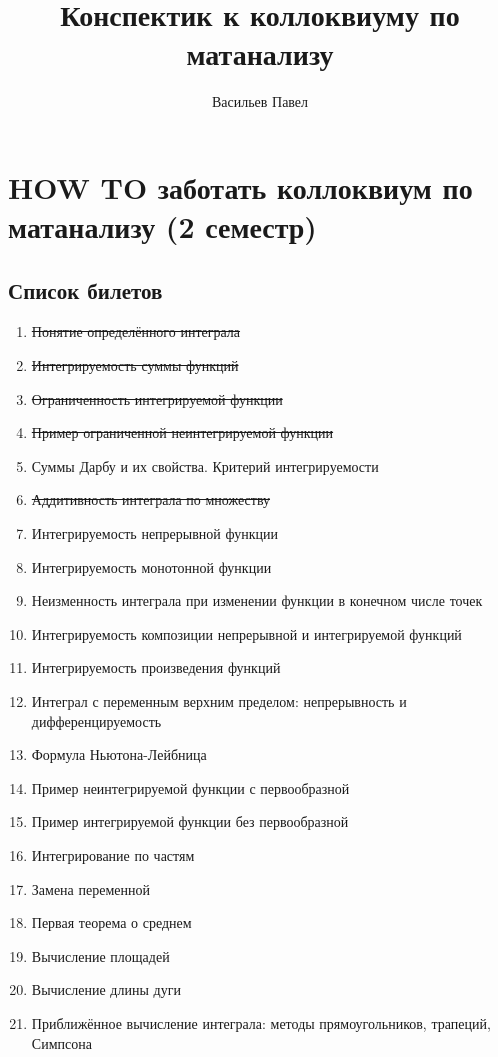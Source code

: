 \documentclass[a4paper]{article}
\title{Конспектик к коллоквиуму по матанализу}
\author{Васильев Павел}
\begin{document}
\section*{HOW TO заботать коллоквиум по матанализу (2 семестр)}


\subsection*{Список билетов}
\begin{enumerate}
\item \sout{Понятие определённого интеграла}
\item \sout{Интегрируемость суммы функций}
\item \sout{Ограниченность интегрируемой функции}
\item \sout{Пример ограниченной неинтегрируемой функции}
\item Суммы Дарбу и их свойства. Критерий интегрируемости
\item \sout{Аддитивность интеграла по множеству}
\item Интегрируемость непрерывной функции
\item Интегрируемость монотонной функции
\item Неизменность интеграла при изменении функции в конечном числе точек
\item Интегрируемость композиции непрерывной и интегрируемой функций
\item Интегрируемость произведения функций
\item Интеграл с переменным верхним пределом: непрерывность и дифференцируемость
\item Формула Ньютона-Лейбница
\item Пример неинтегрируемой функции с первообразной
\item Пример интегрируемой функции без первообразной
\item Интегрирование по частям
\item Замена переменной
\item Первая теорема о среднем
\item Вычисление площадей
\item Вычисление длины дуги
\item Приближённое вычисление интеграла: методы прямоугольников, трапеций, Симпсона 
\end{enumerate}

\newpage
\end{document}

